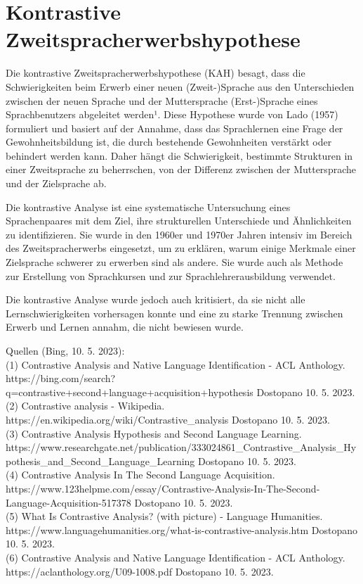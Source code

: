 \documentclass[
  letterpaper,
]{scrbook}
\begin{document}
\hypertarget{kontrastive-zweitspracherwerbshypothese}{%
\section{Kontrastive
Zweitspracherwerbshypothese}\label{kontrastive-zweitspracherwerbshypothese}}

Die kontrastive Zweitspracherwerbshypothese (KAH) besagt, dass die
Schwierigkeiten beim Erwerb einer neuen (Zweit-)Sprache aus den
Unterschieden zwischen der neuen Sprache und der Muttersprache
(Erst-)Sprache eines Sprachbenutzers abgeleitet werden¹. Diese Hypothese
wurde von Lado (1957) formuliert und basiert auf der Annahme, dass das
Sprachlernen eine Frage der Gewohnheitsbildung ist, die durch bestehende
Gewohnheiten verstärkt oder behindert werden kann. Daher hängt die
Schwierigkeit, bestimmte Strukturen in einer Zweitsprache zu
beherrschen, von der Differenz zwischen der Muttersprache und der
Zielsprache ab.

Die kontrastive Analyse ist eine systematische Untersuchung eines
Sprachenpaares mit dem Ziel, ihre strukturellen Unterschiede und
Ähnlichkeiten zu identifizieren. Sie wurde in den 1960er und 1970er
Jahren intensiv im Bereich des Zweitspracherwerbs eingesetzt, um zu
erklären, warum einige Merkmale einer Zielsprache schwerer zu erwerben
sind als andere. Sie wurde auch als Methode zur Erstellung von
Sprachkursen und zur Sprachlehrerausbildung verwendet.

Die kontrastive Analyse wurde jedoch auch kritisiert, da sie nicht alle
Lernschwierigkeiten vorhersagen konnte und eine zu starke Trennung
zwischen Erwerb und Lernen annahm, die nicht bewiesen wurde.

Quellen (Bing, 10. 5. 2023):\\
(1) Contrastive Analysis and Native Language Identiﬁcation - ACL
Anthology.
https://bing.com/search?q=contrastive+second+language+acquisition+hypothesis
Dostopano 10. 5. 2023.\\
(2) Contrastive analysis - Wikipedia.
https://en.wikipedia.org/wiki/Contrastive\_analysis Dostopano 10. 5.
2023.\\
(3) Contrastive Analysis Hypothesis and Second Language Learning.
https://www.researchgate.net/publication/333024861\_Contrastive\_Analysis\_Hypothesis\_and\_Second\_Language\_Learning
Dostopano 10. 5. 2023.\\
(4) Contrastive Analysis In The Second Language Acquisition.
https://www.123helpme.com/essay/Contrastive-Analysis-In-The-Second-Language-Acquisition-517378
Dostopano 10. 5. 2023.\\
(5) What Is Contrastive Analysis? (with picture) - Language Humanities.
https://www.languagehumanities.org/what-is-contrastive-analysis.htm
Dostopano 10. 5. 2023.\\
(6) Contrastive Analysis and Native Language Identiﬁcation - ACL
Anthology. https://aclanthology.org/U09-1008.pdf Dostopano 10. 5. 2023.
\end{document}
